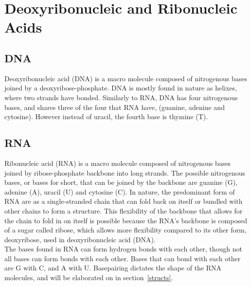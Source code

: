 \section{Deoxyribonucleic and Ribonucleic Acids}%

\subsection{DNA}
Deoxyribonucleic acid (DNA) is a macro molecule composed of nitrogenous bases 
joined by a deoxyribose-phosphate. DNA is mostly found in nature as helixes, 
where two strands have bonded. Similarly to RNA, DNA has four nitrogenous 
bases, and shares three of the four that RNA have, (guanine, adenine and cytosine). 
However instead of uracil, the fourth base is thymine (T). 

\subsection{RNA} %
Ribonucleic acid (RNA) is a macro molecule composed of nitrogenous 
bases joined by ribose-phosphate backbone into long strands. 
The possible nitrogenous bases, or bases for short, 
that can be joined by the backbone are guanine (G), adenine (A), uracil (U) 
and cytosine (C). In nature, the predominant form of RNA are as a 
single-stranded chain that can fold back on itself or bundled with other chains 
to form a structure. This flexibility of the backbone that allows for the chain 
to fold in on itself is possible because the RNA's backbone is composed of a 
sugar called ribose, which allows more flexibility compared to its other form, 
deoxyribose, used in deoxyribonucleic acid (DNA).\\

The bases found in RNA can form hydrogen bonds with each other, though not all 
bases can form bonds with each other. Bases that can bond with each other are 
G with C, and A with U. Basepairing dictates 
the shape of the RNA molecules, and will be elaborated on in section~\ref{structs}.

